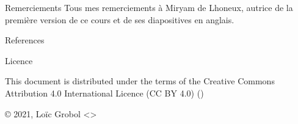 \documentclass[
	hyperref={unicode},
	xcolor={svgnames, table},
	aspectratio=169,
	french,
]{beamer}
\begin{document}
\begin{frame}{Remerciements}
	Tous mes remerciements à Miryam de Lhoneux, autrice de la première version de ce cours et de ses diapositives en anglais.

\end{frame}


\begin{frame}[allowframebreaks]{References}
	\printbibliography[heading=none]
\end{frame}

\begin{frame}{Licence}
	\begin{center}
		{\huge \ccby}
		\vfill
		This document is distributed under the terms of the Creative Commons Attribution 4.0 International Licence (CC BY 4.0) ()

		\vfill
		© 2021, Loïc Grobol <>

	\end{center}
\end{frame}
\end{document}
